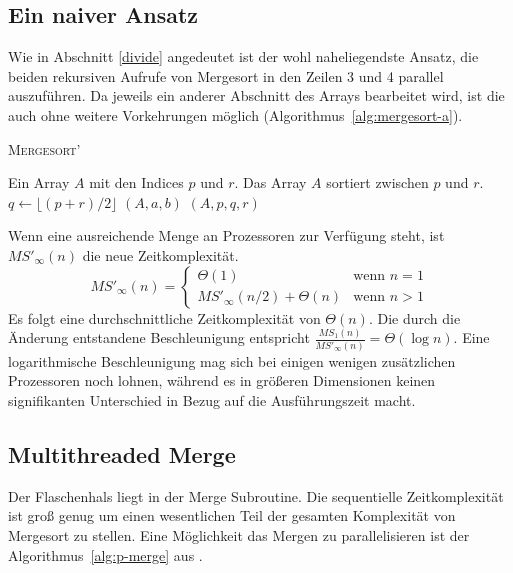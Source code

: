 \subsection{Ein naiver Ansatz}
Wie in Abschnitt \ref{divide} angedeutet ist der wohl naheliegendste Ansatz, die
beiden rekursiven Aufrufe von Mergesort in den Zeilen 3 und 4 parallel
auszuführen.
Da jeweils ein anderer Abschnitt des Arrays bearbeitet wird, ist die auch ohne
weitere Vorkehrungen möglich (Algorithmus~\ref{alg:mergesort-a}).
\begin{algorithm}
    \caption{{\rmfamily \textsc{Mergesort'}}}
    \label{alg:mergesort-a}
    \begin{algorithmic}[1]
        \Require Ein Array $A$ mit den Indices $p$ und $r$.
        \Ensure Das Array $A$ sortiert zwischen $p$ und $r$.
            \State $q \gets \lfloor (p + r) / 2 \rfloor$
                $(A, a, b)$
            \EndParDo
            $(A, p, q, r)$
        \EndIf
    \end{algorithmic}
\end{algorithm}
Wenn eine ausreichende Menge an Prozessoren zur Verfügung steht, ist
$MS'_\infty(n)$ die neue Zeitkomplexität.
\begin{equation}
    MS'_\infty(n) = \begin{cases}
        \Theta(1) & \text{wenn } n = 1 \\
        MS'_\infty(n/2) + \Theta(n) & \text{wenn } n > 1
    \end{cases}
\end{equation}
Es folgt eine durchschnittliche Zeitkomplexität von $\Theta(n)$.
Die durch die Änderung entstandene Beschleunigung entspricht
$\frac{MS_1(n)}{MS'_\infty(n)} = \Theta(\log n)$.
Eine logarithmische Beschleunigung mag sich bei einigen wenigen zusätzlichen
Prozessoren noch lohnen, während es in größeren Dimensionen keinen signifikanten
Unterschied in Bezug auf die Ausführungszeit macht.
\cite[S.797f.]{cormen}

\subsection{Multithreaded Merge}
Der Flaschenhals liegt in der Merge Subroutine.
Die sequentielle Zeitkomplexität ist groß genug um einen wesentlichen Teil der
gesamten Komplexität von Mergesort zu stellen.
Eine Möglichkeit das Mergen zu parallelisieren ist der
Algorithmus~\ref{alg:p-merge} aus \cite{cormen}.

